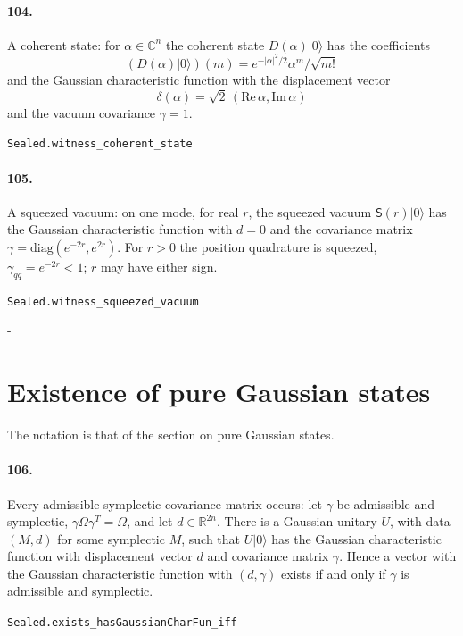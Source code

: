 \documentclass[11pt]{article}
\makeatletter
\newcommand{\keepspace}[1]{\par\penalty-100\begingroup\setlength{\dimen@}{#1}\dimen@ii\pagegoal\advance\dimen@ii-\pagetotal\ifdim\dimen@>\dimen@ii\ifdim\dimen@ii>\z@\vfil\fi\break\fi\endgroup}
\makeatother
\begin{document}
\paragraph{104.} A coherent state: for $\alpha \in \mathbb C^n$ the coherent state $D(\alpha)|0\rangle$ has the coefficients \[(D(\alpha)|0\rangle)(m) = e^{-|\alpha|^2/2} \alpha^m/\sqrt{m!}\] and the Gaussian characteristic function with the displacement vector \[\delta(\alpha) = \sqrt2\, (\mathrm{Re}\, \alpha, \mathrm{Im}\, \alpha)\] and the vacuum covariance $\gamma = 1$.\par{\footnotesize\texttt{Sealed.witness\_coherent\_state}}

\paragraph{105.} A squeezed vacuum: on one mode, for real $r$, the squeezed vacuum $\mathsf S(r)|0\rangle$ has the Gaussian characteristic function with $d = 0$ and the covariance matrix $\gamma = \mathrm{diag}(e^{-2r}, e^{2r})$. For $r > 0$ the position quadrature is squeezed, $\gamma_{qq} = e^{-2r} < 1$; $r$ may have either sign.\par{\footnotesize\texttt{Sealed.witness\_squeezed\_vacuum}}

\keepspace{14\baselineskip}\section*{Existence of pure Gaussian states}
The notation is that of the section on pure Gaussian states.

\paragraph{106.} Every admissible symplectic covariance matrix occurs: let $\gamma$ be admissible and symplectic, $\gamma \Omega \gamma^T = \Omega$, and let $d \in \mathbb R^{2n}$. There is a Gaussian unitary $U$, with data $(M, d)$ for some symplectic $M$, such that $U|0\rangle$ has the Gaussian characteristic function with displacement vector $d$ and covariance matrix $\gamma$. Hence a vector with the Gaussian characteristic function with $(d, \gamma)$ exists if and only if $\gamma$ is admissible and symplectic.\par{\footnotesize\texttt{Sealed.exists\_hasGaussianCharFun\_iff}}
\end{document}
